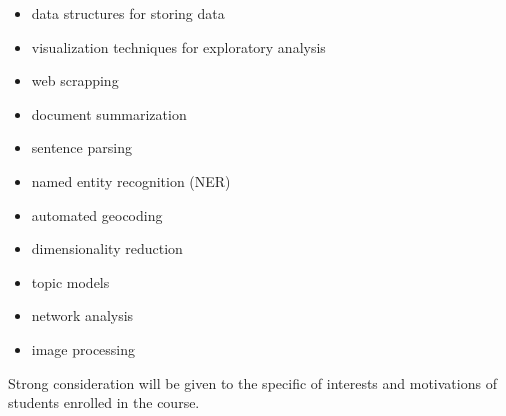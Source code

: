 \documentclass[12pt]{article}
\begin{document}
\begin{itemize}[noitemsep,topsep=6pt]
\item data structures for storing data
\item visualization techniques for exploratory analysis
\item web scrapping
\item document summarization
\item sentence parsing
\item named entity recognition (NER)
\item automated geocoding
\item dimensionality reduction
\item topic models
\item network analysis
\item image processing
\end{itemize}

\vspace{3pt}

Strong consideration will be given to the specific of interests and
motivations of students enrolled in the course.
\end{document}
